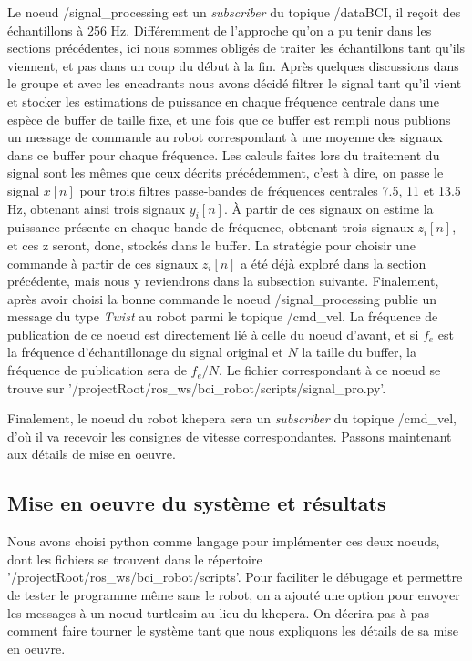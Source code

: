 Le noeud /signal\_processing est un \textit{subscriber} du topique /dataBCI, il reçoit des échantillons à 256 Hz. Différemment de l'approche qu'on a pu tenir dans les sections précédentes, ici nous sommes obligés de traiter les échantillons tant qu'ils viennent, et pas dans un coup du début à la fin. Après quelques discussions dans le groupe et avec les encadrants nous avons décidé filtrer le signal tant qu'il vient et stocker les estimations de puissance en chaque fréquence centrale dans une espèce de buffer de taille fixe, et une fois que ce buffer est rempli nous publions un message de commande au robot correspondant à une moyenne des signaux dans ce buffer pour chaque fréquence. Les calculs faites lors du traitement du signal sont les mêmes que ceux décrits précédemment, c'est à dire, on passe le signal \(x[n]\) pour trois filtres passe-bandes de fréquences centrales 7.5, 11 et 13.5 Hz, obtenant ainsi trois signaux \(y_i[n]\). À partir de ces signaux on estime la puissance présente en chaque bande de fréquence, obtenant trois signaux \(z_i[n]\), et ces z seront, donc, stockés dans le buffer. La stratégie pour choisir une commande à partir de ces signaux \(z_i[n]\) a été déjà exploré dans la section précédente, mais nous y reviendrons dans la subsection suivante. Finalement, après avoir choisi la bonne commande le noeud /signal\_processing publie un message du type \textit{Twist} au robot parmi le topique /cmd\_vel. La fréquence de publication de ce noeud est directement lié à celle du noeud d'avant, et si \(f_e\) est la fréquence d'échantillonage du signal original et \(N\) la taille du buffer, la fréquence de publication sera de \(f_e/N\). Le fichier correspondant à ce noeud se trouve sur '/projectRoot/ros\_ws/bci\_robot/scripts/signal\_pro.py'.

Finalement, le noeud du robot khepera sera un \textit{subscriber} du topique /cmd\_vel, d'où il va recevoir les consignes de vitesse correspondantes. Passons maintenant aux détails de mise en oeuvre.

\subsection{Mise en oeuvre du système et résultats} \label{result}

Nous avons choisi python comme langage pour implémenter ces deux noeuds, dont les fichiers se trouvent dans le répertoire '/projectRoot/ros\_ws/bci\_robot/scripts'. Pour faciliter le débugage et permettre de tester le programme même sans le robot, on a ajouté une option pour envoyer les messages à un noeud turtlesim au lieu du khepera. On décrira pas à pas comment faire tourner le système tant que nous expliquons les détails de sa mise en oeuvre.

